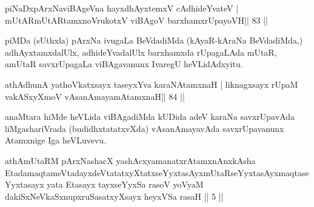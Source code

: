 

\begin{shl}
piNaDxpArxNaviBAgeVna hayxdhAyxtemxV cAdhideYvateV |
mUtARmUtARtamxnoVrukotxV viBAgoV barxhamxrUpayoVH\hfill || 83 ||
\end{shl}

\begin{artha}
piMDa (sUthxla) pArxNa ivugaLa BeVdadiMda (kAyaR-kAraNa BeVdadiMda,) adhAyxtamxdalUlx, adhideYvadalUlx barxhamxda rUpagaLAda mUtaR, amUtaR savxrUpagaLa viBAgavanunx IvaregU heVLidAdxyitu.
\end{artha}

\begin{shl}
athAdhunA yathoVkatxsayx taseyxYva karaNAtamxnaH |
liknagxsayx rUpaM vakASxyXmoV vAsanAmayamAtamxnaH\hfill || 84 ||
\end{shl}

\begin{artha}
anaMtara hiMde heVLida viBAgadiMda kUDida adeV karaNa savxrUpavAda
liMgashariVrada (budidhxtatatxvXda) vAsanAmayavAda savxrUpavanunx
Atamxnige Iga heVLuvevu.
\end{artha}


\begin{kandikeshl}
athAmUtaRM pArxNashacX yashAcxyamanatxrAtamxnAnxkAsha EtadamaqtameVtadayxdeVtatatxyXtatxseYyxtasAyxmUtaRseYyxtasAyxmaqtaseYyxtasayx yata Etasayx tayxseYyxSa rasoV yoV\s yaM dakiSxNeV\s kaSxnupxruSasatxyXsayx heyxVSa rasaH || 5 ||
\end{kandikeshl}


